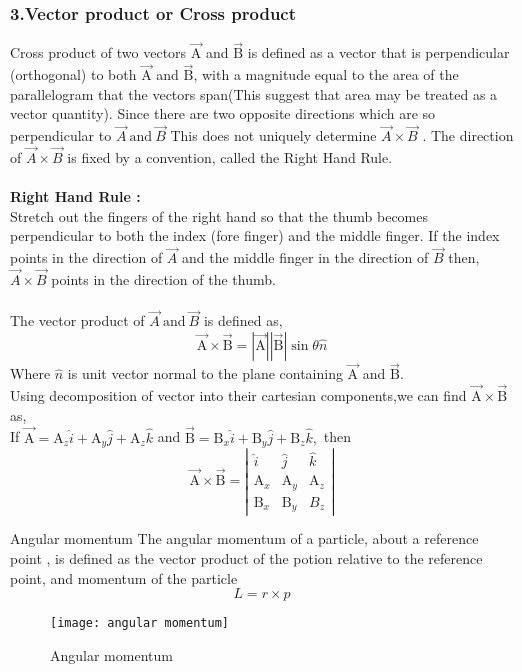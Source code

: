 \subsubsection{{\large 3}.Vector  product or Cross product}
Cross product of two vectors $\vec{\mathrm A}$ and $\vec{\mathrm B}$  is defined as a vector that is perpendicular (orthogonal) to both $\vec{\mathrm A}$ and $\vec{\mathrm B}$, with  a magnitude equal to the area of the parallelogram that the vectors span(This suggest that area may be treated as a vector quantity). Since there are two opposite directions which are so perpendicular to $\vec{A} \ \text{and} \ \vec{B}$  This does not uniquely determine $\vec{A} \times \vec{B}$ . The direction of $\vec{A} \times \vec{B}$ is fixed by a convention, called the Right Hand Rule.\\\\
\textbf{Right Hand Rule :}\\
Stretch out the fingers of the right hand so that the thumb becomes perpendicular to both the index (fore
finger) and the middle finger. If the index points in the direction of $\vec{A}$ and the middle finger in the direction of
$\vec{B}$ then, $\vec{A} \times \vec{B}$ points in the direction of the thumb.\\\\
The vector product of $\vec{A} \ \text{and} \ \vec{B}$  is defined as, 
\begin{equation}
\vec{\mathrm A} \times \vec{\mathrm B}=|\vec{\mathrm A}||\vec{\mathrm B}| \sin \theta  \hat{n}
\end{equation}
Where $\hat{n}$ is unit vector normal to the plane containing $\vec{\mathrm A}$ and $\vec{\mathrm B}$.
\\Using decomposition of vector into their cartesian components,we can find $\vec{\mathrm A} \times \vec{\mathrm B}$ as,
\\ If $\vec{\mathrm A}=\mathrm A_{z} \hat{i}+\mathrm A_{y} \hat{j}+\mathrm A_{z} \hat{k}$ and $\vec{\mathrm B}=\mathrm B_{x} \hat{i}+\mathrm B_{y} \hat{j}+\mathrm B_{z} \hat{k},$ then $$\vec{\mathrm A} \times \vec{\mathrm B}=\left|\begin{array}{lll}\hat{i} & \hat{j} & \hat{k} \\ \mathrm A_{x} & \mathrm A_{y} & \mathrm A_{z} \\ \mathrm B_{x} & \mathrm B_{y} & B_{z}\end{array}\right|$$
\begin{example}
	Angular momentum
	\newline The angular momentum of a particle, about a reference point , is defined as the vector product of the potion relative to the reference point, and momentum of the particle
	 $$ L=r\times p$$
	 \begin{figure}[H]
	 	\begin{center}
	 		\texttt{[image: angular momentum]}
	 	\end{center}
 	\caption{Angular momentum}
	 \end{figure}
\end{example}
